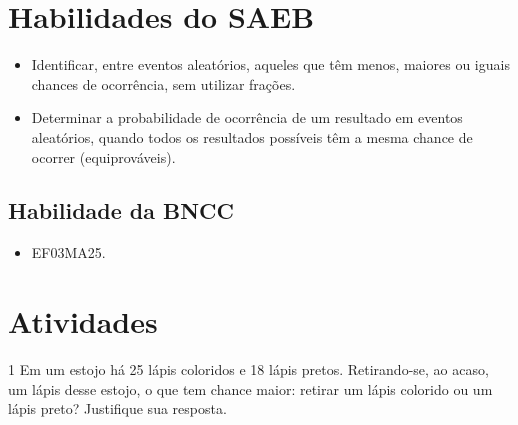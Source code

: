 \section*{Habilidades do SAEB}

\begin{itemize}
\item Identificar, entre eventos aleatórios, aqueles que têm menos, maiores ou
iguais chances de ocorrência, sem utilizar frações.

\item Determinar a probabilidade de ocorrência de um resultado em eventos
aleatórios, quando todos os resultados possíveis têm a mesma chance de
ocorrer (equiprováveis).
\end{itemize}

\subsection{Habilidade da BNCC}

\begin{itemize}
  \item 
 EF03MA25.
\end{itemize}


\pagebreak 

\section*{Atividades}

\num{1} Em um estojo há 25 lápis coloridos e 18 lápis pretos. Retirando-se, ao
acaso, um lápis desse estojo, o que tem chance maior: retirar um lápis
colorido ou um lápis preto? Justifique sua resposta.

